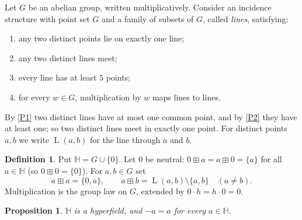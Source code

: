 \documentclass[11pt]{article}
\newtheorem{proposition}[theorem]{Proposition}
\theoremstyle{definition}
\newtheorem{definition}[theorem]{Definition}
\theoremstyle{remark}
\newcommand{\HH}{\mathbb{H}}
\newcommand{\bp}{\boxplus}
\DeclareMathOperator{\Ln}{L}
\begin{document}
Let $G$ be an abelian group, written multiplicatively. Consider an incidence structure with point set $G$ and a family of subsets of $G$, called \emph{lines}, satisfying:
\begin{enumerate}[label=\textup{(P\arabic*)},nosep]
\item\label{P1} any two distinct points lie on exactly one line;
\item\label{P2} any two distinct lines meet;
\item\label{P3} every line has at least $5$ points;
\item\label{P4} for every $w\in G$, multiplication by $w$ maps lines to lines.
\end{enumerate}
By \ref{P1} two distinct lines have at most one common point, and by \ref{P2} they have at least one; so two distinct lines meet in exactly one point. For distinct points $a,b$ we write $\Ln(a,b)$ for the line through $a$ and $b$.
\begin{definition}\label{def:H}
Put $\HH=G\cup\{0\}$. Let $0$ be neutral: $0\bp a=a\bp 0=\{a\}$ for all $a\in\HH$ (so $0\bp0=\{0\}$). For $a,b\in G$ set
\[
a\bp a=\{0,a\},\qquad a\bp b=\Ln(a,b)\setminus\{a,b\}\quad(a\neq b).
\]
Multiplication is the group law on $G$, extended by $0\cdot h=h\cdot 0=0$.
\end{definition}

\begin{proposition}\label{prop:hyperfield}
$\HH$ is a hyperfield, and $-a=a$ for every $a\in\HH$.
\end{proposition}
\end{document}

